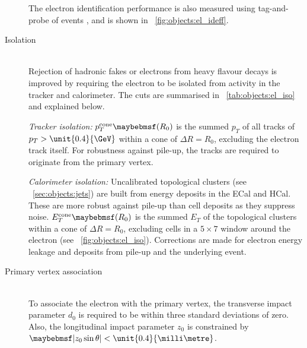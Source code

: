 \begin{description}
 	The electron identification performance is also measured using tag-and-probe of 
 	\HepProcess{\PZ \HepTo \Pe\Pe} events \cite{ElectronPerf:2010,ElectronPerf:2012}, 
 	and is shown in \Figure~\ref{fig:objects:el_ideff}.
\item[Isolation] \hfill \\
	Rejection of hadronic fakes or electrons from heavy flavour decays is improved by 
	requiring the electron to be isolated from activity in the tracker and calorimeter. 
	The cuts are summarised in \Table~\ref{tab:objects:el_iso} and explained below.

	\textit{Tracker isolation:} $p_T^{\text{cone}}\parenths{R_0}$ is the summed $p_T$ of 
	all tracks of $p_T > \unit{0.4}{\GeV}$ within a cone of $\Delta R = R_0$, excluding 
	the electron track itself. For robustness against pile-up, the tracks are required to 
	originate from the primary vertex.

	\textit{Calorimeter isolation:} Uncalibrated topological clusters (see 
	\Section~\ref{sec:objects:jets}) are built from energy deposits in the \ac{ECal} 
	and \ac{HCal}. These are more robust against pile-up than cell deposits as they 
	suppress noise. $E_T^{\text{cone}}\parenths{R_0}$ is the summed $E_T$ of the 
	topological clusters within a cone of $\Delta R = R_0$, excluding cells in a 
	$5 \times 7$ window around the electron (see \Figure~\ref{fig:objects:el_iso}). 
	Corrections are made for electron energy leakage and deposits from pile-up and the 
	underlying event.
\item[Primary vertex association] \hfill \\
	To associate the electron with the primary vertex, the transverse impact parameter 
	$d_0$ is required to be within three standard deviations of zero. Also, the 
	longitudinal impact parameter $z_0$ is constrained by $\mods{z_0 \sin\theta} < 
	\unit{0.4}{\milli\metre}$.
\end{description}

